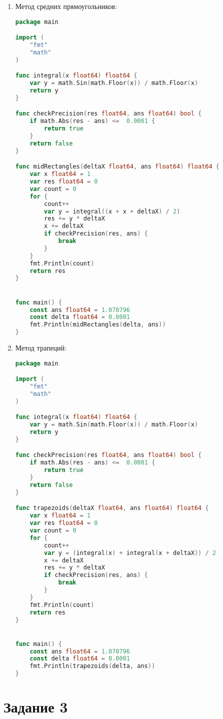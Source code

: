 \documentclass[a4paper, 14pt, titlepage, fleqn]{extarticle}
\begin{document}
\begin{enumerate}
			\pagebreak
			\item Метод средних прямоугольников:
				\begin{lstlisting}[language=Go]
package main

import (
	"fmt"
	"math"
)

func integral(x float64) float64 {
    var y = math.Sin(math.Floor(x)) / math.Floor(x)
    return y
}

func checkPrecision(res float64, ans float64) bool {
    if math.Abs(res - ans) <=  0.0001 {
        return true
    }
    return false
}

func midRectangles(deltaX float64, ans float64) float64 {
    var x float64 = 1
    var res float64 = 0
    var count = 0
    for {
        count++
        var y = integral((x + x + deltaX) / 2)
        res += y * deltaX
        x += deltaX
        if checkPrecision(res, ans) {
            break
        }
    }
    fmt.Println(count)
    return res
}


func main() {
    const ans float64 = 1.070796
    const delta float64 = 0.0001 
    fmt.Println(midRectangles(delta, ans))
}
				\end{lstlisting}

			\pagebreak
			\item Метод трапеций:
				\begin{lstlisting}[language=Go]
package main

import (
	"fmt"
	"math"
)

func integral(x float64) float64 {
    var y = math.Sin(math.Floor(x)) / math.Floor(x)
    return y
}

func checkPrecision(res float64, ans float64) bool {
    if math.Abs(res - ans) <=  0.0001 {
        return true
    }
    return false
}

func trapezoids(deltaX float64, ans float64) float64 {
    var x float64 = 1
    var res float64 = 0
    var count = 0
    for {
        count++
        var y = (integral(x) + integral(x + deltaX)) / 2
        x += deltaX
        res += y * deltaX
        if checkPrecision(res, ans) {
            break
        }
    }
    fmt.Println(count)
    return res
}


func main() {
    const ans float64 = 1.070796
    const delta float64 = 0.0001
    fmt.Println(trapezoids(delta, ans))
}
				\end{lstlisting}
		\end{enumerate}

	\pagebreak
	\section*{Задание 3}
\end{document}

